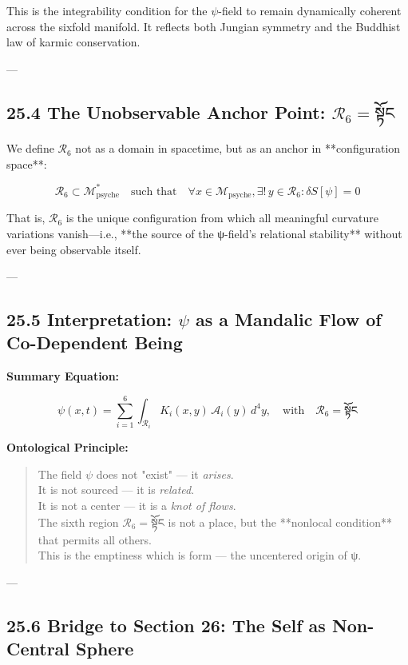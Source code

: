 \documentclass[12pt]{article}
\begin{document}
\begin{enumerate}
This is the integrability condition for the $\psi$-field to remain dynamically coherent across the sixfold manifold. It reflects both Jungian symmetry and the Buddhist law of karmic conservation.

---

\subsection*{25.4 The Unobservable Anchor Point: $\mathcal{R}_6 = \text{སྟོང}$}

We define $\mathcal{R}_6$ not as a domain in spacetime, but as an anchor in **configuration space**:

\[
\mathcal{R}_6 \subset \mathcal{M}_\text{psyche}^\ast \quad \text{such that} \quad \forall x \in \mathcal{M}_\text{psyche}, \exists ! \, y \in \mathcal{R}_6 : \delta S[\psi] = 0
\]

That is, $\mathcal{R}_6$ is the unique configuration from which all meaningful curvature variations vanish—i.e., **the source of the ψ-field’s relational stability** without ever being observable itself.

---

\subsection*{25.5 Interpretation: $\psi$ as a Mandalic Flow of Co-Dependent Being}

\vspace{0.5em}
\textbf{Summary Equation:}

\[
\boxed{
\psi(x,t) = \sum_{i=1}^{6} \int_{\mathcal{R}_i} K_i(x,y) \, \mathcal{A}_i(y) \, d^4y, \quad \text{with} \quad \mathcal{R}_6 = \text{སྟོང}
}
\]

\textbf{Ontological Principle:}

\begin{quote}
The field $\psi$ does not "exist" — it \textit{arises}. \\
It is not sourced — it is \textit{related}. \\
It is not a center — it is a \textit{knot of flows}. \\
The sixth region $\mathcal{R}_6 = \text{སྟོང}$ is not a place, but the **nonlocal condition** that permits all others. \\
This is the emptiness which is form — the uncentered origin of ψ.
\end{quote}

---

\subsection*{25.6 Bridge to Section 26: The Self as Non-Central Sphere}


\end{enumerate}
\end{document}
